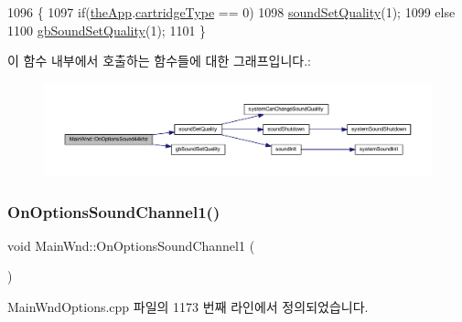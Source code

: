 \begin{DoxyCode}
1096 \{
1097   \textcolor{keywordflow}{if}(\mbox{\hyperlink{_v_b_a_8cpp_a8095a9d06b37a7efe3723f3218ad8fb3}{theApp}}.\mbox{\hyperlink{class_v_b_a_af300759fcbc7eeb00ce73f956fc5ddb7}{cartridgeType}} == 0)
1098     \mbox{\hyperlink{_sound_8cpp_a46bef5048521e8000f3850e686e7eb22}{soundSetQuality}}(1);
1099   \textcolor{keywordflow}{else}
1100     \mbox{\hyperlink{_g_b_8h_a86ed9a5e6bb5230a501d753280690618}{gbSoundSetQuality}}(1);
1101 \}
\end{DoxyCode}
이 함수 내부에서 호출하는 함수들에 대한 그래프입니다.\+:
\nopagebreak
\begin{figure}[H]
\begin{center}
\leavevmode
\includegraphics[width=350pt]{class_main_wnd_a3045a6a1996566e65701d44a0db19a50_cgraph}
\end{center}
\end{figure}
\mbox{\label{class_main_wnd_a6a21a6e3756553868f1792f371e7c468}} 
\subsubsection{\texorpdfstring{On\+Options\+Sound\+Channel1()}{OnOptionsSoundChannel1()}}
{\footnotesize\ttfamily void Main\+Wnd\+::\+On\+Options\+Sound\+Channel1 (\begin{DoxyParamCaption}{ }\end{DoxyParamCaption})\hspace{0.3cm}{\ttfamily [protected]}}



Main\+Wnd\+Options.\+cpp 파일의 1173 번째 라인에서 정의되었습니다.


